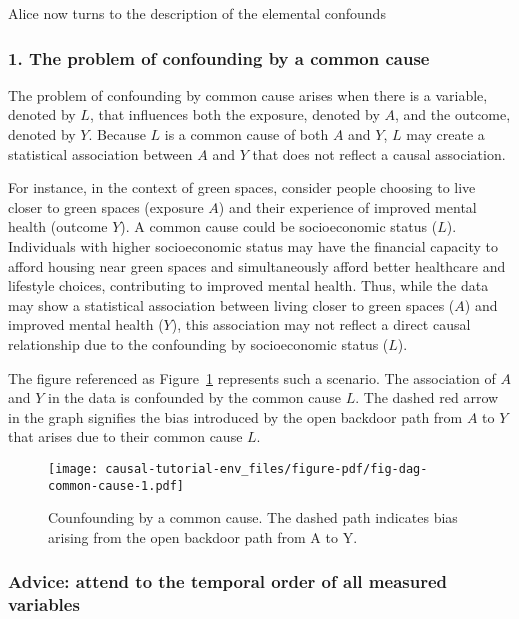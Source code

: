 \documentclass[
  singlecolumn]{article}
\begin{document}
Alice now turns to the description of the elemental confounds

\hypertarget{the-problem-of-confounding-by-a-common-cause}{%
\subsubsection{1. The problem of confounding by a common
cause}\label{the-problem-of-confounding-by-a-common-cause}}

The problem of confounding by common cause arises when there is a
variable, denoted by \(L\), that influences both the exposure, denoted
by \(A\), and the outcome, denoted by \(Y.\) Because \(L\) is a common
cause of both \(A\) and \(Y\), \(L\) may create a statistical
association between \(A\) and \(Y\) that does not reflect a causal
association.

For instance, in the context of green spaces, consider people choosing
to live closer to green spaces (exposure \(A\)) and their experience of
improved mental health (outcome \(Y\)). A common cause could be
socioeconomic status (\(L\)). Individuals with higher socioeconomic
status may have the financial capacity to afford housing near green
spaces and simultaneously afford better healthcare and lifestyle
choices, contributing to improved mental health. Thus, while the data
may show a statistical association between living closer to green spaces
(\(A\)) and improved mental health (\(Y\)), this association may not
reflect a direct causal relationship due to the confounding by
socioeconomic status (\(L\)).

The figure referenced as Figure~\ref{fig-dag-common-cause} represents
such a scenario. The association of \(A\) and \(Y\) in the data is
confounded by the common cause \(L\). The dashed red arrow in the graph
signifies the bias introduced by the open backdoor path from \(A\) to
\(Y\) that arises due to their common cause \(L\).

\begin{figure}

{\centering \texttt{[image: causal-tutorial-env\_files/figure-pdf/fig-dag-common-cause-1.pdf]}

}

\caption{\label{fig-dag-common-cause}Counfounding by a common cause. The
dashed path indicates bias arising from the open backdoor path from A to
Y.}

\end{figure}

\hypertarget{advice-attend-to-the-temporal-order-of-all-measured-variables}{%
\subsubsection{Advice: attend to the temporal order of all measured
variables}\label{advice-attend-to-the-temporal-order-of-all-measured-variables}}
\end{document}
